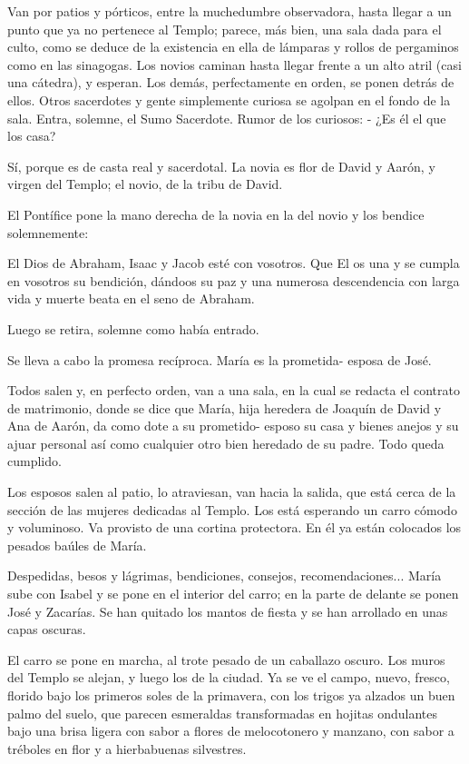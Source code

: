 \documentclass[12pt]{book} %
\begin{document}
Van por patios y pórticos, entre la muchedumbre observadora, hasta llegar a un punto que ya no pertenece al Templo; parece, más bien, una sala dada para el culto, como se deduce de la existencia en ella de lámparas y rollos de pergaminos como en las sinagogas. Los novios caminan hasta llegar frente a un alto atril (casi una cátedra), y esperan. Los demás, perfectamente en orden, se ponen detrás de ellos. Otros sacerdotes y gente simplemente curiosa se agolpan en el fondo de la sala. Entra, solemne, el Sumo Sacerdote. Rumor de los curiosos: - ¿Es él el que los casa? 

Sí, porque es de casta real y sacerdotal. La novia es flor de David y Aarón, y virgen del Templo; el novio, de la tribu de David. 

El Pontífice pone la mano derecha de la novia en la del novio y los bendice solemnemente: 

El Dios de Abraham, Isaac y Jacob esté con vosotros. Que El os una y se cumpla en vosotros su bendición, dándoos su paz y una numerosa descendencia con larga vida y muerte beata en el seno de Abraham. 

Luego se retira, solemne como había entrado. 

Se lleva a cabo la promesa recíproca. María es la prometida- esposa de José. 

Todos salen y, en perfecto orden, van a una sala, en la cual se redacta el contrato de matrimonio, donde se dice que María, hija heredera de Joaquín de David y Ana de Aarón, da como dote a su prometido- esposo su casa y bienes anejos y su ajuar personal así como cualquier otro bien heredado de su padre. Todo queda cumplido. 

Los esposos salen al patio, lo atraviesan, van hacia la salida, que está cerca de la sección de las mujeres dedicadas al Templo. Los está esperando un carro cómodo y voluminoso. Va provisto de una cortina protectora. En él ya están colocados los pesados baúles de María. 

Despedidas, besos y lágrimas, bendiciones, consejos, recomendaciones... María sube con Isabel y se pone en el interior del carro; en la parte de delante se ponen José y Zacarías. Se han quitado los mantos de fiesta y se han arrollado en unas capas oscuras. 

El carro se pone en marcha, al trote pesado de un caballazo oscuro. Los muros del Templo se alejan, y luego los de la ciudad. Ya se ve el campo, nuevo, fresco, florido bajo los primeros soles de la primavera, con los trigos ya alzados un buen palmo del suelo, que parecen esmeraldas transformadas en hojitas ondulantes bajo una brisa ligera con sabor a flores de melocotonero y manzano, con sabor a tréboles en flor y a hierbabuenas silvestres. 
\end{document}
